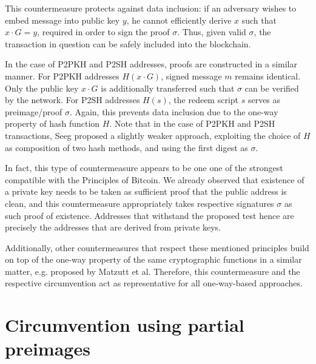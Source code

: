 \documentclass[a4paper,11pt,titlepage]{scrbook}
\begin{document}
This countermeasure protects against data inclusion: if an adversary wishes to embed message into public key $y$, he cannot efficiently derive $x$ such that $x\cdot G = y$, required in order to sign the proof $\sigma$.
Thus, given valid $\sigma$, the transaction in question can be safely included into the blockchain.

In the case of P2PKH and P2SH addresses, proofs are constructed in a similar manner.
For P2PKH addresses $H(x\cdot G)$, signed message $m$ remains identical.
Only the public key $x\cdot G$ is additionally transferred such that $\sigma$ can be verified by the network.
For P2SH addresses $H(s)$, the redeem script $s$ serves as preimage/proof $\sigma$.
Again, this prevents data inclusion due to the one-way property of hash function $H$.
Note that in the case of P2PKH and P2SH transactions, Seeg proposed a slightly weaker approach, exploiting the choice of $H$ as composition of two hash methods, and using the first digest as $\sigma$.

In fact, this type of countermeasure appears to be one one of the strongest compatible with the Principles of Bitcoin.
We already observed that existence of a private key needs to be taken as sufficient proof that the public address is clean,
and this countermeasure appropriately takes respective signatures $\sigma$ as such proof of existence.
Addresses that withstand the proposed test hence are precisely the addresses that are derived from private keys.

Additionally, other countermeasures that respect these mentioned principles build on top of the one-way property of the same cryptographic functions in a similar matter, e.g.\@ {} proposed by Matzutt et al. \cite[sec.~IV.D]{matzutt_thwarting_2018}
Therefore, this countermeasure and the respective circumvention act as representative for all one-way-based approaches.

\section{Circumvention using partial preimages}

\end{document}
